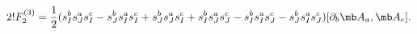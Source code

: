 \begin{equation}
2!F^{(3)}_{2}=\frac{1}{2}(s^{b}_{I}s^{a}_{J}s^{c}_{I}-s^{b}_{J}s^{a}_{I}s^{c}_{I}+s^{b}_{J}s^{a}_{J}s^{c}_{I}+s^{b}_{I}s^{a}_{J}s^{c}_{J}-s^{b}_{I}s^{a}_{I}s^{c}_{J}-s^{b}_{J}s^{a}_{I}s^{c}_{J})[\partial_{b}{\mb A}_{a},{\mb A}_{c}].
\end{equation}

